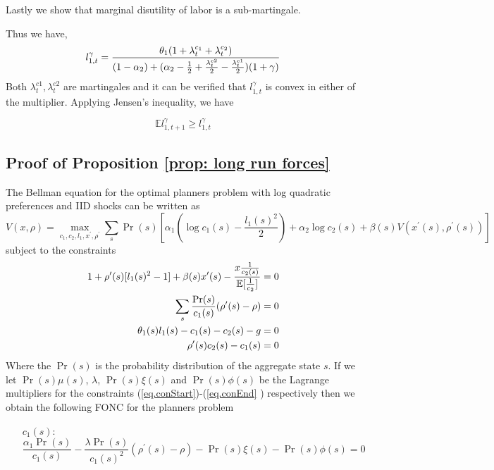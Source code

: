 \documentclass[thmsb,11pt]{article}
\begin{document}
{\vspace{3mm}Lastly we show that marginal disutility of labor is a
sub-martingale.

Thus we have,
\begin{equation}
l_{1,t}^{\gamma}=\frac{\theta_1(1+\lambda^{c_1}_t+\lambda^{c_2}_t)}{%
(1-\alpha_2)+ (\alpha_2-\frac{1}{2} + \frac{\lambda_t^{c2}}{2}-\frac{%
\lambda^{c1}_t}{2})(1+\gamma)}
\end{equation}
Both $\lambda_t^{c1},\lambda_t^{c2}$ are martingales and it can be verified
that $l_{1,t}^{\gamma}$ is convex in either of the multiplier. Applying
Jensen's inequality, we have

\begin{equation*}
\mathbb{E}l_{1,t+1}^{\gamma }\geq l_{1,t}^{\gamma }
\end{equation*}

\smallskip

\subsection{Proof of Proposition \protect\ref{prop: long run forces}}

The Bellman equation for the optimal planners problem with log quadratic
preferences and IID shocks can be written as
\begin{equation*}
V(x,\rho) = \max_{c_1,c_2,l_1,x^{\prime },\rho^{\prime }} \sum_s \Pr(s)\left[%
\alpha_1\left(\log c_1(s) -\frac{l_1(s)^2}{2}\right)+\alpha_2\log
c_2(s)+\beta(s) V(x^{\prime }(s),\rho^{\prime }(s))\right]
\end{equation*}%
subject to the constraints
\begin{align}
1+\rho^{\prime }(s)[l_1(s)^2-1]+\beta(s)x^{\prime }(s) - \frac{x\frac{1}{%
c_2(s)}}{\mathbb{E}[\frac1{c_2}]}=0  \label{eq.conStart} \\
\sum_s\frac{\Pr(s)}{c_1(s)}(\rho^{\prime }(s)-\rho) = 0 \\
\theta_1(s)l_1(s) -c_1(s)-c_2(s)-g = 0 \\
\rho^{\prime }(s) c_2(s)-c_1(s) = 0  \label{eq.conEnd}
\end{align}
Where the $\Pr(s)$ is the probability distribution of the aggregate state $s$. If
we let $\Pr(s)\mu(s)$, $\lambda$, $\Pr(s)\xi(s)$ and $\Pr(s)\phi(s)$ be the
Lagrange multipliers for the constraints (\ref{eq.conStart})-(\ref{eq.conEnd}%
) respectively then we obtain the following FONC for the planners problem

\begin{enumerate}
\item[$c_1(s):$]
\begin{equation}
\frac{\alpha_1\Pr(s)}{c_1(s)}-\frac{\lambda \Pr(s)}{c_1(s)^2}(\rho^{\prime
}(s)-\rho)-\Pr(s)\xi(s)-\Pr(s)\phi(s) = 0  \label{eq.c1FOC}
\end{equation}


\end{enumerate}}
\end{document}
